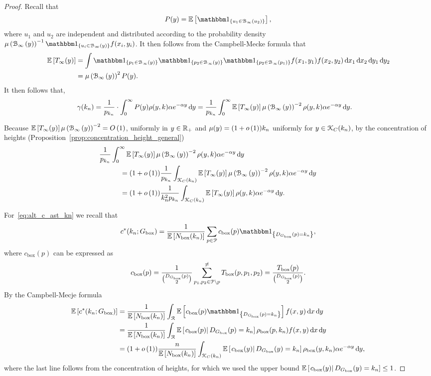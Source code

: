 \begin{proof}
Recall that 
\[
	P(y) = \Exp{\ind{u_1 \in \BallPo{u_2}}},
\]
where $u_1$ and $u_2$ are independent and distributed according to the probability density \\$\Mu{\BallPo{y}}^{-1} \ind{u_i \in \BallPo{y}} f(x_i, y_i)$. It then follows from the Campbell-Mecke formula that
\begin{align*}
	\Exp{T_\infty(y)} &= \int \ind{p_1 \in \BallPo{y}}\ind{p_2 \in \BallPo{y}}
		\ind{p_2 \in \BallPo{p_1}} f(x_1,y_1) f(x_2,y_2) \dd x_1 \dd x_2 \dd y_1 \dd y_2\\
	&= \Mu{\BallPo{y}}^2 P(y).
\end{align*}
It then follows that,
\begin{align*}
	\gamma(k_n) &= \frac{1}{p_{k_n}} \cdot \int_0^\infty P(y) \rho(y,k) \alpha e^{-\alpha y} \operatorname{\mathrm{d}\hspace{-2pt}} y
	= \frac{1}{p_{k_n}} \int_0^\infty \mathbb{E}\left[T_\infty(y)\right] \mu\left({\mathcal B}_{\infty}\left(y\right)\right)^{-2} \rho(y,k) 
		\alpha e^{-\alpha y} \operatorname{\mathrm{d}\hspace{-2pt}} y.
\end{align*}

Because $\mathbb{E}\left[T_\infty(y)\right] \mu\left({\mathcal B}_{\infty}\left(y\right)\right)^{-2} = O\left(1\right)$, uniformly in $y \in {\ensuremath{\mathbb R}}_+$ and $\mu(y) = (1+o\left(1\right)) k_n$ uniformly for $y \in {\mathcal K}_C(k_n)$, by the concentration of heights (Proposition~\ref{prop:concentration_height_general})
\begin{align*}
	&\hspace{-30pt} \frac{1}{p_{k_n}} 
		\int_0^\infty \Exp{T_\infty(y)} \Mu{\BallPo{y}}^{-2} \rho(y,k) \alpha e^{-\alpha y} \dd y \\
	&= (1+\smallO{1}) \frac{1}{p_{k_n}} 
		\int_{\Kcal_C(k_n)} \Exp{T_\infty(y)} \Mu{\BallPo{y}}^{-2} \rho(y,k) \alpha e^{-\alpha y} \dd y \\
	&= (1+ \smallO{1}) \frac{1}{k_n^2 p_{k_n}} \int_{\Kcal_C(k_n)} \Exp{T_\infty(y)} \rho(y,k) \alpha e^{-\alpha y} \dd y.
\end{align*}

For~\eqref{eq:alt_c_ast_kn} we recall that
\[
	c^\ast(k_n; \Gbox) = \frac{1}{\Exp{\Nbox(k_n)}} \sum_{p \in \Pcal} c_{\text{box}}(p)\ind{\Dbox(p) = k_n},
\]
where $c_{\text{box}}(p)$ can be expressed as
\[
	c_{\text{box}}(p) = \frac{1}{\binom{D_{G_{\mathrm{box}}}(p)}{2}} \sum_{p_1, p_2 \in {\mathcal P} \setminus p}^{\ne} T_{\text{box}}(p,p_1,p_2)
	= \frac{T_{\text{box}}(p)}{\binom{D_{G_{\mathrm{box}}}(p)}{2}}.
\]
By the Campbell-Mecje formula
\begin{align*}
	\Exp{c^\ast(k_n; \Gbox)} 
	&= \frac{1}{\Exp{\Nbox(k_n)}} \int_{\Rcal} \Exp{c_{\text{box}}(p)\ind{\Dbox(p) = k_n}} f(x,y) \dd x \dd y\\
	&= \frac{1}{\Exp{\Nbox(k_n)}} \int_{\Rcal} \CExp{c_{\text{box}}(p)}{\Dbox(p) = k_n}\rho_{\text{box}}(p,k_n) 
		f(x,y) \dd x \dd y\\
	&= (1+\smallO{1})\frac{n}{\Exp{\Nbox(k_n)}} \int_{\Kcal_C(k_n)} \CExp{c_{\text{box}}(y)}{\Dbox(y) = k_n}
		\rho_{\mathrm{box}}(y,k_n) \alpha e^{-\alpha y} \dd y,
\end{align*}
where the last line follows from the concentration of heights, for which we used the upper bound $\mathbb{E}\left[\left.c_{\text{box}}(y)\right|D_{G_{\mathrm{box}}}(y) = k_n\right] \le 1$.


\end{proof}
